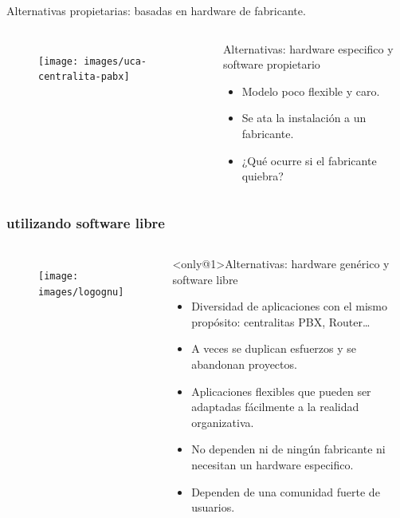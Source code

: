 \documentclass{beamer}
\begin{document}
\begin{frame}{Alternativas propietarias: basadas en hardware de fabricante.}
  \begin{columns}
    
  \begin{figure}[bt]
      \centering
      \texttt{[image: images/uca-centralita-pabx]}
    \end{figure}
  \begin{block}{Alternativas: hardware especifico y software propietario}
    
    \begin{itemize}[<+-| alert@+>]
    \item Modelo poco flexible y caro.
    \item Se ata la instalación a un fabricante.
    \item ¿Qué ocurre si el fabricante quiebra? 
    \end{itemize}
\end{block}
\end{columns}
\end{frame}


\subsubsection{utilizando software libre}

\begin{frame}
  \begin{columns}
    
  \begin{figure}[!h]
    \centering
    \texttt{[image: images/logognu]}
  \end{figure}
  \begin{block}<only@1>{Alternativas: hardware genérico y software libre}
    \begin{itemize}
    \item Diversidad de aplicaciones con el mismo propósito: centralitas PBX, Router\ldots
    \item A veces se duplican esfuerzos y se abandonan proyectos.
    \item Aplicaciones flexibles que pueden ser adaptadas fácilmente a la realidad organizativa.
    \item No dependen ni de ningún fabricante ni necesitan un hardware especifico.
    \item Dependen de una comunidad fuerte de usuarios.
    \end{itemize}
    

  \end{block}
  
\end{columns}
\end{frame}
\end{document}
